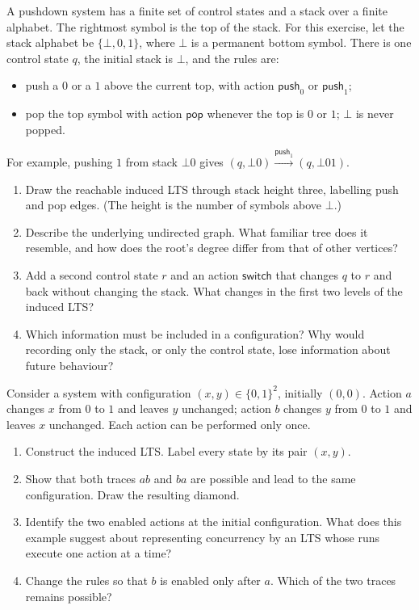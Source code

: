 \documentclass{tutorial}
\begin{document}
\begin{exercise}
A pushdown system has a finite set of control states and a stack over a
finite alphabet. The rightmost symbol is the top of the stack. For this
exercise, let the stack alphabet be $\{\bot,0,1\}$, where $\bot$ is a
permanent bottom symbol. There is one control state $q$, the initial stack
is $\bot$, and the rules are:
\begin{itemize}
  \item push a $0$ or a $1$ above the current top, with action
        $\mathsf{push}_0$ or $\mathsf{push}_1$;
  \item pop the top symbol with action $\mathsf{pop}$ whenever the top is
        $0$ or $1$; $\bot$ is never popped.
\end{itemize}
For example, pushing $1$ from stack $\bot 0$ gives
$(q,\bot 0)\xrightarrow{\mathsf{push}_1}(q,\bot 01)$.
\begin{enumerate}
  \item Draw the reachable induced LTS through stack height three,
        labelling push and pop edges. (The height is the number of symbols
        above $\bot$.)
  \item Describe the underlying undirected graph. What familiar tree does
        it resemble, and how does the root's degree differ from that of
        other vertices?
  \item Add a second control state $r$ and an action $\mathsf{switch}$ that
        changes $q$ to $r$ and back without changing the stack. What changes
        in the first two levels of the induced LTS?
  \item Which information must be included in a configuration? Why would
        recording only the stack, or only the control state, lose
        information about future behaviour?
\end{enumerate}
\end{exercise}


\begin{exercise}
Consider a system with configuration $(x,y)\in\{0,1\}^2$, initially
$(0,0)$. Action $a$ changes $x$ from $0$ to $1$ and leaves $y$ unchanged;
action $b$ changes $y$ from $0$ to $1$ and leaves $x$ unchanged. Each
action can be performed only once.
\begin{enumerate}
  \item Construct the induced LTS. Label every state by its pair $(x,y)$.
  \item Show that both traces $ab$ and $ba$ are possible and lead to the
        same configuration. Draw the resulting diamond.
  \item Identify the two enabled actions at the initial configuration.
        What does this example suggest about representing concurrency by
        an LTS whose runs execute one action at a time?
  \item Change the rules so that $b$ is enabled only after $a$. Which of
        the two traces remains possible?
\end{enumerate}
\end{exercise}
\end{document}
